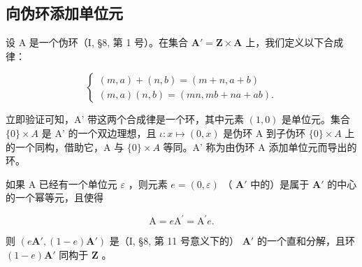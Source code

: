 \subsection{向伪环添加单位元}

设 A 是一个伪环（I, §8, 第 1 号）。在集合 \(\mathbf{A}' = \mathbf{Z} \times \mathbf{A}\) 上，我们定义以下合成律：

\[
\left\{ \begin{array}{l} (m, a) + (n, b) = (m + n, a + b) \\ (m, a) (n, b) = (m n, m b + n a + a b). \end{array} \right.\tag{1}
\]

立即验证可知，A' 带这两个合成律是一个环，其中元素 \((1,0)\) 是单位元。集合 \(\{0\} \times A\) 是 A' 的一个双边理想，且 \(\iota: x \mapsto (0, x)\) 是伪环 A 到子伪环 \(\{0\} \times A\) 上的一个同构，借助它，A 与 \(\{0\} \times A\) 等同。A' 称为由伪环 A 添加单位元而导出的环。

如果 A 已经有一个单位元 \(\varepsilon\) ，则元素 \(e = (0, \varepsilon)\) （ \(\mathbf{A}'\) 中的）是属于 \(\mathbf{A}'\) 的中心的一个幂等元，且使得

\[
\mathrm{A} = e \mathrm{A} ^ {\prime} = \mathrm{A} ^ {\prime} e.
\]

则 \((e\mathbf{A}', (1 - e)\mathbf{A}')\) 是（I, §8, 第 11 号意义下的） \(\mathbf{A}'\) 的一个直和分解，且环 \((1 - e)\mathbf{A}'\) 同构于 \(\mathbf{Z}\) 。

